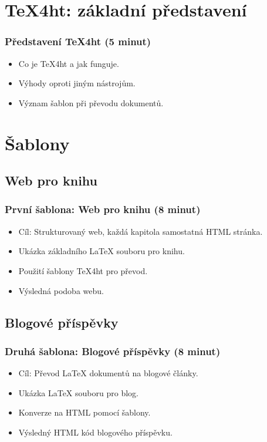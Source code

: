 \documentclass{beamer}
\begin{document}
\section{TeX4ht: základní představení}
\begin{frame}
\frametitle{Představení TeX4ht (5 minut)}
\begin{itemize}
    \item Co je TeX4ht a jak funguje.
    \item Výhody oproti jiným nástrojům.
    \item Význam šablon při převodu dokumentů.
\end{itemize}
\end{frame}

\section{Šablony}

\subsection{Web pro knihu}
\begin{frame}
\frametitle{První šablona: Web pro knihu (8 minut)}
\begin{itemize}
    \item Cíl: Strukturovaný web, každá kapitola samostatná HTML stránka.
    \item Ukázka základního LaTeX souboru pro knihu.
    \item Použití šablony TeX4ht pro převod.
    \item Výsledná podoba webu.
\end{itemize}
\end{frame}

\subsection{Blogové příspěvky}
\begin{frame}
\frametitle{Druhá šablona: Blogové příspěvky (8 minut)}
\begin{itemize}
    \item Cíl: Převod LaTeX dokumentů na blogové články.
    \item Ukázka LaTeX souboru pro blog.
    \item Konverze na HTML pomocí šablony.
    \item Výsledný HTML kód blogového příspěvku.
\end{itemize}
\end{frame}
\end{document}
